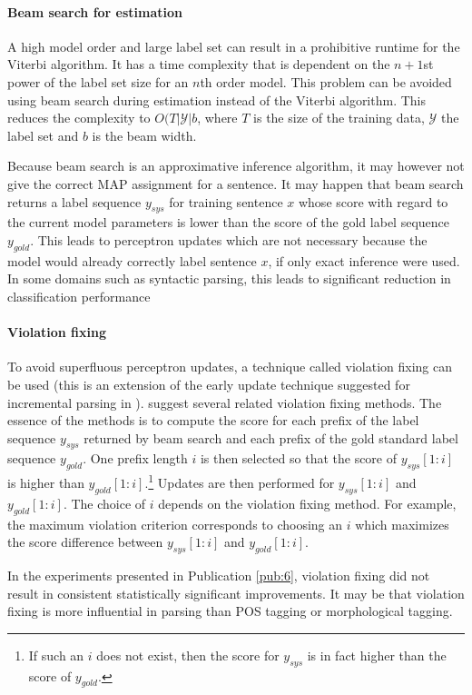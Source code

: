 \paragraph{Beam search for estimation} A high model order and large
label set can result in a prohibitive runtime for the Viterbi
algorithm.  It has a time complexity that is dependent on the $n +
1$st power of the label set size for an $n$th order model. This
problem can be avoided using beam search during estimation instead of
the Viterbi algorithm. This reduces the complexity to
$O(T|\mathcal{Y}|b$, where $T$ is the size of the training data,
$\mathcal{Y}$ the label set and $b$ is the beam width.

Because beam search is an approximative inference algorithm, it may
however not give the correct MAP assignment for a sentence. It may
happen that beam search returns a label sequence $y_{sys}$ for
training sentence $x$ whose score with regard to the current model
parameters is lower than the score of the gold label sequence
$y_{gold}$. This leads to perceptron updates which are not necessary
because the model would already correctly label sentence $x$, if only exact
inference were used. In some domains such as syntactic parsing, this
leads to significant reduction in classification performance
\citep{Huang2012}

\paragraph{Violation fixing} To avoid superfluous perceptron updates,
a technique called violation fixing can be used \citep{Huang2012}
(this is an extension of the early update technique suggested for
incremental parsing in \cite{Collins2004}). \cite{Huang2012} suggest
several related violation fixing methods. The essence of the methods
is to compute the score for each prefix of the label sequence
$y_{sys}$ returned by beam search and each prefix of the gold standard
label sequence $y_{gold}$. One prefix length $i$ is then selected so
that the score of $y_{sys}[1:i]$ is higher than
$y_{gold}[1:i]$.\footnote{If such an $i$ does not exist, then the
  score for $y_{sys}$ is in fact higher than the score of $y_{gold}$.}
Updates are then performed for $y_{sys}[1:i]$ and $y_{gold}[1:i]$. The
choice of $i$ depends on the violation fixing method. For example, the
maximum violation criterion corresponds to choosing an $i$ which
maximizes the score difference between $y_{sys}[1:i]$ and
$y_{gold}[1:i]$.

In the experiments presented in Publication \ref{pub:6}, violation
fixing did not result in consistent statistically significant
improvements. It may be that violation fixing is more influential in
parsing than POS tagging or morphological tagging.

